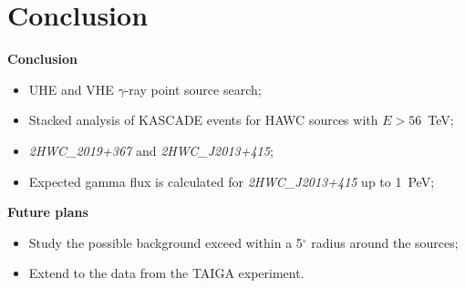 \section{Conclusion}

\begin{frame}
\textcolor{kit-green100}{\textbf{Conclusion}}
\begin{itemize}
  \item UHE and VHE $\gamma$-ray point source search;
  \item Stacked analysis of KASCADE events for HAWC sources with $E > 56$~TeV;
  \item \textit{2HWC\_2019+367} and \textit{2HWC\_J2013+415};
  \item Expected gamma flux is calculated for \textit{2HWC\_J2013+415} up to 1~PeV;



\end{itemize}

\textcolor{kit-green100}{\textbf{Future plans}}
  \begin{itemize}
    \item Study the possible background exceed within a 5$^\circ$ radius around the sources;
    \item Extend to the data from the TAIGA experiment.
  \end{itemize}
\end{frame}

